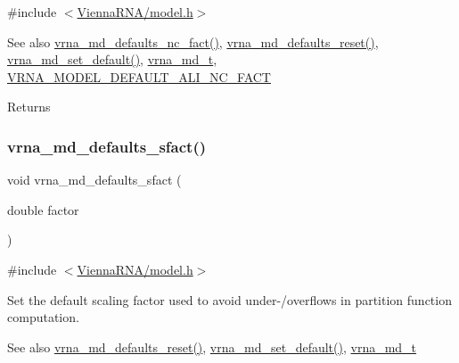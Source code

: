 {\ttfamily \#include $<$\hyperlink{model_8h}{Vienna\+R\+N\+A/model.\+h}$>$}

\begin{DoxySeeAlso}{See also}
\hyperlink{group__model__details_gac35e596c850dce3ad55c49119fd7d471}{vrna\+\_\+md\+\_\+defaults\+\_\+nc\+\_\+fact()}, \hyperlink{group__model__details_ga70834424cf804d149937de89f80ceb45}{vrna\+\_\+md\+\_\+defaults\+\_\+reset()}, \hyperlink{group__model__details_ga8ac6ff84936282436f822644bf841f66}{vrna\+\_\+md\+\_\+set\+\_\+default()}, \hyperlink{group__model__details_ga1f8a10e12a0a1915f2a4eff0b28ea17c}{vrna\+\_\+md\+\_\+t}, \hyperlink{group__model__details_ga8f774daaafec28160c1ca5d09f2cbdba}{V\+R\+N\+A\+\_\+\+M\+O\+D\+E\+L\+\_\+\+D\+E\+F\+A\+U\+L\+T\+\_\+\+A\+L\+I\+\_\+\+N\+C\+\_\+\+F\+A\+CT} 
\end{DoxySeeAlso}
\begin{DoxyReturn}{Returns}

\end{DoxyReturn}
\mbox{\label{group__model__details_ga3f73d3029d3d0025d4cc311510cd95a3}} 
\subsubsection{\texorpdfstring{vrna\+\_\+md\+\_\+defaults\+\_\+sfact()}{vrna\_md\_defaults\_sfact()}}
{\footnotesize\ttfamily void vrna\+\_\+md\+\_\+defaults\+\_\+sfact (\begin{DoxyParamCaption}\item[{double}]{factor }\end{DoxyParamCaption})}



{\ttfamily \#include $<$\hyperlink{model_8h}{Vienna\+R\+N\+A/model.\+h}$>$}



Set the default scaling factor used to avoid under-\//overflows in partition function computation. 

\begin{DoxySeeAlso}{See also}
\hyperlink{group__model__details_ga70834424cf804d149937de89f80ceb45}{vrna\+\_\+md\+\_\+defaults\+\_\+reset()}, \hyperlink{group__model__details_ga8ac6ff84936282436f822644bf841f66}{vrna\+\_\+md\+\_\+set\+\_\+default()}, \hyperlink{group__model__details_ga1f8a10e12a0a1915f2a4eff0b28ea17c}{vrna\+\_\+md\+\_\+t} 
\end{DoxySeeAlso}

